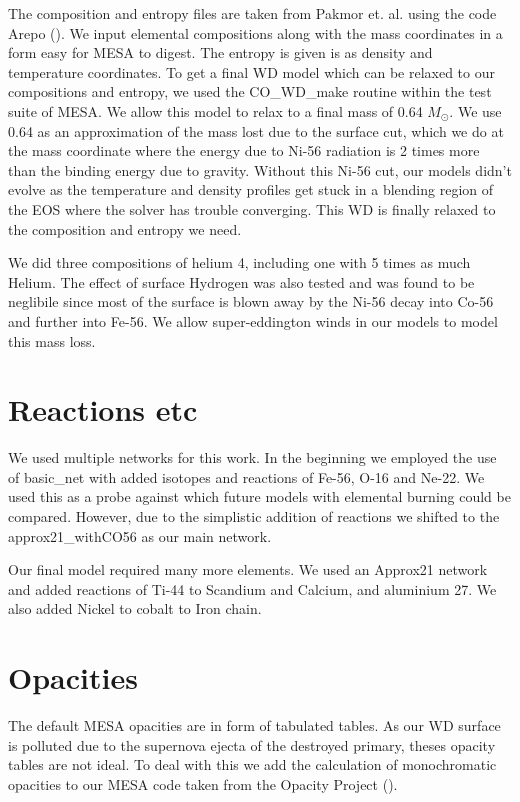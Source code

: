 \documentclass[fleqn,usenatbib]{mnras}
\begin{document}
The composition and entropy files are taken from Pakmor et. al. using the code Arepo (\cite{2020ApJS..248...32W}). We input  elemental compositions along with the mass coordinates in a form easy for MESA to digest. The entropy is given is as density and temperature coordinates. To get a final WD model which can be relaxed to our compositions and entropy, we used the CO\_WD\_make routine within the test suite of MESA. We allow this model to relax to a final mass of 0.64 $M_{\odot}$. We use 0.64 as an approximation of the mass lost due to the surface cut, which we do at the mass coordinate where the energy due to Ni-56 radiation is 2 times more than the binding energy due to gravity. Without this Ni-56 cut, our models didn't evolve as the temperature and density profiles get stuck in a blending region of the EOS where the solver has trouble converging. This WD is finally relaxed to the composition and entropy we need. 

We did three compositions of helium 4, including one with 5 times as much Helium. The effect of surface Hydrogen was also tested and was found to be neglibile since most of the surface is blown away by the Ni-56 decay into Co-56 and further into Fe-56. We allow super-eddington winds in our models to model this mass loss.


\section{Reactions etc}

We used multiple networks for this work. In the beginning we employed the use of basic\_net with added isotopes and reactions of Fe-56, O-16 and Ne-22. We used this as a probe against which future models with elemental burning could be compared. However, due to the simplistic addition of reactions we shifted to the approx21\_withCO56 as our main network.

Our final model required many more elements. We used an Approx21 network and added reactions of Ti-44 to Scandium and Calcium, and aluminium 27. We also added Nickel to cobalt to Iron chain. 

\section{Opacities}

The default MESA opacities are in form of tabulated tables. As our WD surface is polluted due to the supernova ejecta of the destroyed primary, theses opacity tables are not ideal. To deal with this we add the calculation of monochromatic opacities to our MESA code taken from the Opacity Project (\cite{paxton_bill_2011_4390522}). 
\end{document}
